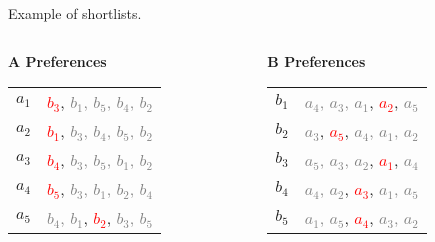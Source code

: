 \documentclass[aspectratio=169,xcolor=dvipsnames]{beamer}
\begin{document}
\begin{frame}{Example of shortlists.}
    \begin{columns}[t]
    \begin{column}{0.45\textwidth}
      \textbf{A Preferences}\\[6pt]
      \begin{tabular}{r@{: }l}
        $a_1$ & \textcolor{red}{$b_3$}, \textcolor{gray}{$b_1$, $b_5$, $b_4$, $b_2$} \\
        $a_2$ & \textcolor{red}{$b_1$}, \textcolor{gray}{$b_3$, $b_4$, $b_5$, $b_2$} \\
        $a_3$ & \textcolor{red}{$b_4$}, \textcolor{gray}{$b_3$, $b_5$, $b_1$, $b_2$} \\
        $a_4$ & \textcolor{red}{$b_5$}, \textcolor{gray}{$b_3$, $b_1$, $b_2$, $b_4$} \\
        $a_5$ & \textcolor{gray}{$b_4$, $b_1$}, \textcolor{red}{$b_2$}, \textcolor{gray}{$b_3$, $b_5$} \\
      \end{tabular}
    \end{column}

    \begin{column}{0.45\textwidth}
      \textbf{B Preferences}\\[6pt]
      \begin{tabular}{r@{: }l}
        $b_1$ & \textcolor{gray}{$a_4$, $a_3$, $a_1$}, \textcolor{red}{$a_2$}, \textcolor{gray}{$a_5$} \\
        $b_2$ & \textcolor{gray}{$a_3$}, \textcolor{red}{$a_5$}, \textcolor{gray}{$a_4$, $a_1$, $a_2$} \\
        $b_3$ & \textcolor{gray}{$a_5$, $a_3$, $a_2$}, \textcolor{red}{$a_1$}, \textcolor{gray}{$a_4$} \\
        $b_4$ & \textcolor{gray}{$a_4$, $a_2$}, \textcolor{red}{$a_3$}, \textcolor{gray}{$a_1$, $a_5$} \\
        $b_5$ & \textcolor{gray}{$a_1$, $a_5$}, \textcolor{red}{$a_4$}, \textcolor{gray}{$a_3$, $a_2$} \\
      \end{tabular}
    \end{column}
  \end{columns}
\end{frame}
\end{document}
